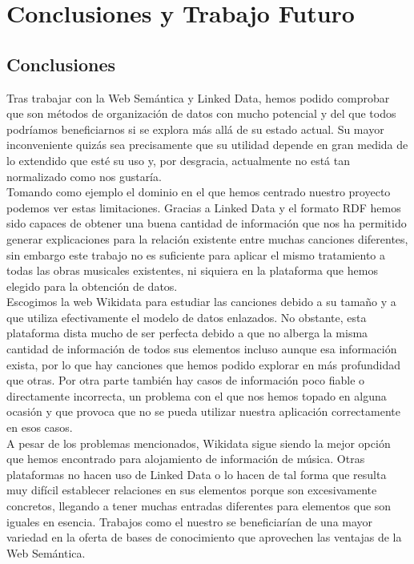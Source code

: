 \chapter{Conclusiones y Trabajo Futuro}
\label{cap:conclusiones}

\section{Conclusiones}

Tras trabajar con la Web Semántica y Linked Data, hemos podido comprobar que son métodos de organización de datos con mucho potencial y del que todos podríamos beneficiarnos si se explora más allá de su estado actual. Su mayor inconveniente quizás sea precisamente que su utilidad depende en gran medida de lo extendido que esté su uso y, por desgracia, actualmente no está tan normalizado como nos gustaría.\\

Tomando como ejemplo el dominio en el que hemos centrado nuestro proyecto podemos ver estas limitaciones. Gracias a Linked Data y el formato RDF hemos sido capaces de obtener una buena cantidad de información que nos ha permitido generar explicaciones para la relación existente entre muchas canciones diferentes, sin embargo este trabajo no es suficiente para aplicar el mismo tratamiento a todas las obras musicales existentes, ni siquiera en la plataforma que hemos elegido para la obtención de datos.\\

Escogimos la web Wikidata para estudiar las canciones debido a su tamaño y a que utiliza efectivamente el modelo de datos enlazados. No obstante, esta plataforma dista mucho de ser perfecta debido a que no alberga la misma cantidad de información de todos sus elementos incluso aunque esa información exista, por lo que hay canciones que hemos podido explorar en más profundidad que otras. Por otra parte también hay casos de información poco fiable o directamente incorrecta, un problema con el que nos hemos topado en alguna ocasión y que provoca que no se pueda utilizar nuestra aplicación correctamente en esos casos.\\

A pesar de los problemas mencionados, Wikidata sigue siendo la mejor opción que hemos encontrado para alojamiento de información de música. Otras plataformas no hacen uso de Linked Data o lo hacen de tal forma que resulta muy difícil establecer relaciones en sus elementos porque son excesivamente concretos, llegando a tener muchas entradas diferentes para elementos que son iguales en esencia. Trabajos como el nuestro se beneficiarían de una mayor variedad en la oferta de bases de conocimiento que aprovechen las ventajas de la Web Semántica.\\

